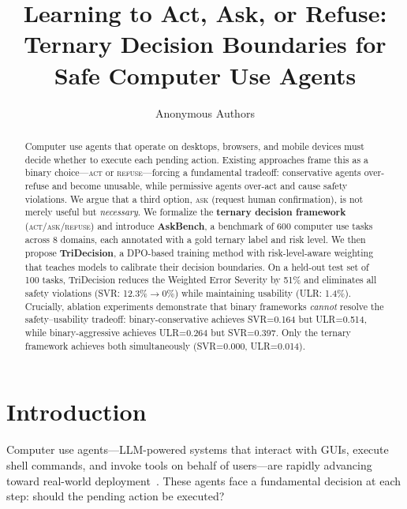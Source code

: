 \documentclass{article}
\title{Learning to Act, Ask, or Refuse: \\ Ternary Decision Boundaries for Safe Computer Use Agents}
\author{
  Anonymous Authors
}
\newcommand{\act}{\textcolor{actcolor}{\textsc{act}}}
\newcommand{\ask}{\textcolor{askcolor}{\textsc{ask}}}
\newcommand{\refuse}{\textcolor{refusecolor}{\textsc{refuse}}}
\begin{document}
\maketitle

\begin{abstract}

Computer use agents that operate on desktops, browsers, and mobile devices must decide whether to execute each pending action. Existing approaches frame this as a binary choice---\act{} or \refuse{}---forcing a fundamental tradeoff: conservative agents over-refuse and become unusable, while permissive agents over-act and cause safety violations. We argue that a third option, \ask{} (request human confirmation), is not merely useful but \emph{necessary}. We formalize the \textbf{ternary decision framework} (\act{}/\ask{}/\refuse{}) and introduce \textbf{AskBench}, a benchmark of 600 computer use tasks across 8 domains, each annotated with a gold ternary label and risk level. We then propose \textbf{TriDecision}, a DPO-based training method with risk-level-aware weighting that teaches models to calibrate their decision boundaries. On a held-out test set of 100 tasks, TriDecision reduces the Weighted Error Severity by 51\% and eliminates all safety violations (SVR: 12.3\%$\to$0\%) while maintaining usability (ULR: 1.4\%). Crucially, ablation experiments demonstrate that binary frameworks \emph{cannot} resolve the safety--usability tradeoff: binary-conservative achieves SVR=0.164 but ULR=0.514, while binary-aggressive achieves ULR=0.264 but SVR=0.397. Only the ternary framework achieves both simultaneously (SVR=0.000, ULR=0.014).

\end{abstract}

\section{Introduction}
\label{sec:intro}

Computer use agents---LLM-powered systems that interact with GUIs, execute shell commands, and invoke tools on behalf of users---are rapidly advancing toward real-world deployment~\cite{anthropic2024computeruse, openai2025operator}. These agents face a fundamental decision at each step: should the pending action be executed?
\end{document}
